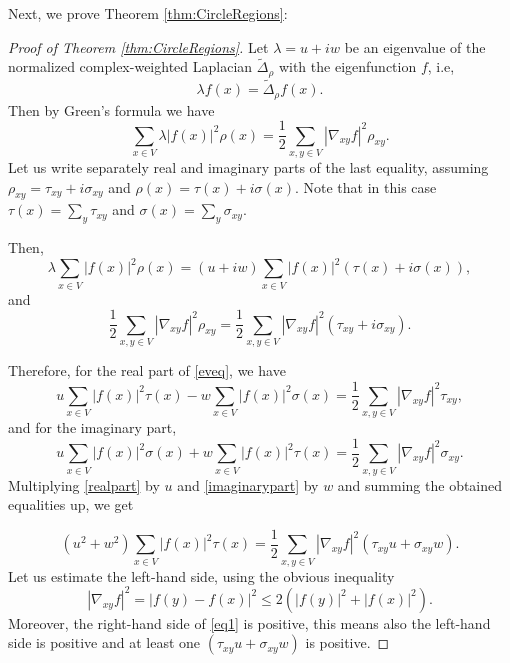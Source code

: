 \documentclass[a4paper,11pt]{amsart}
\theoremstyle{definition}
\begin{document}
Next, we prove Theorem \ref{thm:CircleRegions}:
\begin{proof}[Proof of Theorem \ref{thm:CircleRegions}]
Let ${\lambda=u+iw}$ be an eigenvalue of the normalized complex-weighted Laplacian $\widetilde \Delta_\rho$ with the eigenfunction $f$, i.e, 
\begin{equation*}
\lambda f(x)=\widetilde \Delta_\rho f(x).
\end{equation*}
Then by Green's formula we have
\begin{equation}\label{eveq}
\sum_{x\in V}\lambda|f(x)|^2\rho(x)=\dfrac{1}{2}\sum_{x,y\in V}|\nabla_{xy}f|^2\rho_{xy}.
\end{equation}
Let us write separately real and imaginary parts of the last equality, assuming  ${\rho_{xy}=\tau_{xy}+i\sigma_{xy}}$ and ${\rho(x)=\tau(x)+i\sigma(x)}$. Note that in this case $\tau(x)=\sum_{y}\tau_{xy}$ and $\sigma(x)=\sum_{y}\sigma_{xy}$. 

Then,
\begin{equation*}
\lambda\sum_{x\in V}|f(x)|^2\rho(x)=(u+iw)\sum_{x\in V}|f(x)|^2(\tau(x)+i\sigma(x)),
\end{equation*}
and
\begin{equation*}
\dfrac{1}{2}\sum_{x,y\in V}|\nabla_{xy}f|^2\rho_{xy}=\dfrac{1}{2}\sum_{x,y\in V}|\nabla_{xy}f|^2(\tau_{xy}+i\sigma_{xy}).
\end{equation*}


Therefore, for the real part of \eqref{eveq}, we have
\begin{equation}\label{realpart}
u\sum_{x\in V}|f(x)|^2\tau(x)-w\sum_{x\in V}|f(x)|^2\sigma(x)=\dfrac{1}{2}\sum_{x,y\in V}|\nabla_{xy}f|^2\tau_{xy},
\end{equation}
and for the imaginary part,
\begin{equation}\label{imaginarypart}
u\sum_{x\in V}|f(x)|^2\sigma(x)+w\sum_{x\in V}|f(x)|^2\tau(x)=\dfrac{1}{2}\sum_{x,y\in V}|\nabla_{xy}f|^2\sigma_{xy}.
\end{equation}
Multiplying \eqref{realpart} by $u$ and \eqref{imaginarypart} by $w$ and summing the obtained equalities up, we get

\begin{equation}\label{eq1}
(u^2+w^2)\sum_{x\in V}|f(x)|^2\tau(x)=\dfrac{1}{2}\sum_{x,y\in V}|\nabla_{xy}f|^2(\tau_{xy}u+\sigma_{xy}w).
\end{equation}
Let us estimate the left-hand side, using the obvious inequality 
\begin{equation*}
|\nabla_{xy}f|^2=|f(y)-f(x)|^2\le 2(|f(y)|^2+|f(x)|^2).
\end{equation*}
Moreover, the right-hand side of \eqref{eq1} is positive, this means also the left-hand side is positive and at least one $(\tau_{xy}u+\sigma_{xy}w)$ is positive.


\end{proof}
\end{document}

